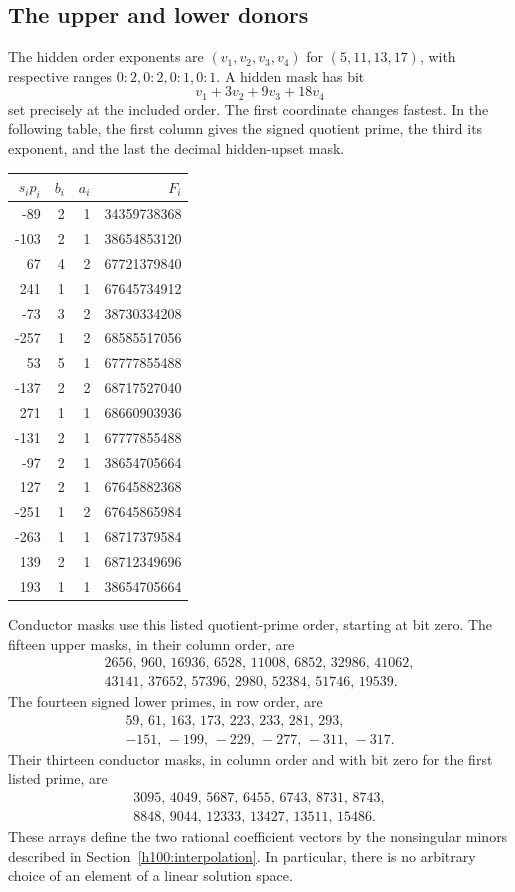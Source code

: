 \subsection{The upper and lower donors}
The hidden order exponents are $(v_1,v_2,v_3,v_4)$ for
$(5,11,13,17)$, with respective ranges $0\!:\!2,0\!:\!2,0\!:\!1,0\!:\!1$.
A hidden mask has bit
\[
 v_1+3v_2+9v_3+18v_4
\]
set precisely at the included order. The first coordinate changes fastest.
In the following table, the first column gives the signed quotient prime,
the third its exponent, and the last the decimal hidden-upset mask.
\begin{center}\small
\begin{tabular}{rrrr}\toprule
$s_ip_i$ & $b_i$ & $a_i$ & $F_i$\\\midrule
-89 & 2 & 1 & 34359738368\\
-103 & 2 & 1 & 38654853120\\
67 & 4 & 2 & 67721379840\\
241 & 1 & 1 & 67645734912\\
-73 & 3 & 2 & 38730334208\\
-257 & 1 & 2 & 68585517056\\
53 & 5 & 1 & 67777855488\\
-137 & 2 & 2 & 68717527040\\
271 & 1 & 1 & 68660903936\\
-131 & 2 & 1 & 67777855488\\
-97 & 2 & 1 & 38654705664\\
127 & 2 & 1 & 67645882368\\
-251 & 1 & 2 & 67645865984\\
-263 & 1 & 1 & 68717379584\\
139 & 2 & 1 & 68712349696\\
193 & 1 & 1 & 38654705664\\
\bottomrule\end{tabular}\end{center}
Conductor masks use this listed quotient-prime order, starting at bit zero.
The fifteen upper masks, in their column order, are
\[
\begin{gathered}
2656,\,960,\,16936,\,6528,\,11008,\,6852,\,32986,\,41062,\\
43141,\,37652,\,57396,\,2980,\,52384,\,51746,\,19539. 
\end{gathered}
\]
The fourteen signed lower primes, in row order, are
\[
\begin{gathered}
59,\,61,\,163,\,173,\,223,\,233,\,281,\,293,\\
-151,\,-199,\,-229,\,-277,\,-311,\,-317.
\end{gathered}
\]
Their thirteen conductor masks, in column order and with bit zero for the
first listed prime, are
\[
\begin{gathered}
3095,\,4049,\,5687,\,6455,\,6743,\,8731,\,8743,\\
8848,\,9044,\,12333,\,13427,\,13511,\,15486.
\end{gathered}
\]
These arrays define the two rational coefficient vectors by the nonsingular
minors described in Section~\ref{h100:interpolation}. In particular, there is
no arbitrary choice of an element of a linear solution space.

